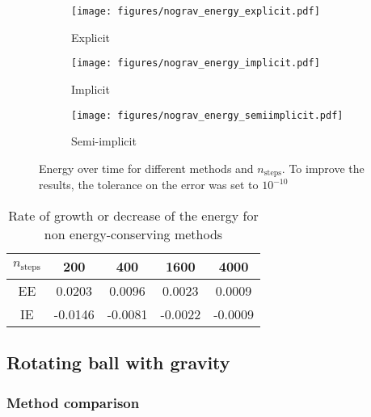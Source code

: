 \begin{figure}[h]
    \centering
    \begin{subfigure}{0.5\linewidth}
        \centering
        \texttt{[image: figures/nograv\_energy\_explicit.pdf]}
        \caption{Explicit}
    \end{subfigure}%
    \begin{subfigure}{0.5\linewidth}
        \centering
        \texttt{[image: figures/nograv\_energy\_implicit.pdf]}
        \caption{Implicit}
    \end{subfigure}
    \begin{subfigure}{0.6\linewidth}
        \centering
        \texttt{[image: figures/nograv\_energy\_semiimplicit.pdf]}
        \caption{Semi-implicit}
    \end{subfigure}
    \caption{Energy over time for different methods and $n_\textrm{steps}$. To improve the results, the tolerance on the error was set to $10^{-10}$}
    \label{fig:nograv:energy}
\end{figure}

\begin{table}[h]
    \centering
    \begin{tabulary}{0.8\linewidth}{C|C|C|C|C}
        \toprule
        $n_\textrm{steps}$ & 200 & 400 & 1600 & 4000 \\
        \midrule
        EE & 0.0203 & 0.0096 & 0.0023 & 0.0009 \\
        IE & -0.0146 & -0.0081 & -0.0022 & -0.0009 \\
        \bottomrule
    \end{tabulary}
    \caption{Rate of growth or decrease of the energy for non energy-conserving methods}
    \label{tab:nograv:rate}
\end{table}

\subsection{Rotating ball with gravity}

\subsubsection{Method comparison}
\label{seq:gravrot:comp}

